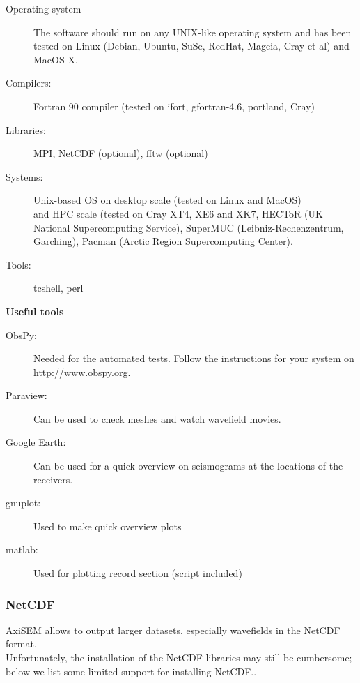 \documentclass{article}
\begin{document}
\begin{description}
    \item[Operating system] The software should run on any UNIX-like operating system and has
          been tested on Linux (Debian, Ubuntu, SuSe, RedHat, Mageia, Cray et al) and MacOS X.
    \item[Compilers:] Fortran 90 compiler (tested on ifort, gfortran-4.6, portland, Cray)
    \item[Libraries:] MPI, NetCDF (optional), fftw (optional)
    \item[Systems:] Unix-based OS on desktop scale (tested on Linux and MacOS)\\ and HPC scale (tested on Cray XT4, XE6 and XK7, HECToR (UK National Supercomputing Service), SuperMUC (Leibniz-Rechenzentrum, Garching), Pacman (Arctic Region Supercomputing Center).
    \item[Tools:] tcshell, perl
\end{description}\vspace*{0.3cm}

\textbf{Useful tools}

\begin{description}
    \item[ObsPy:] Needed for the automated tests. Follow the instructions for your system
          on \url{http://www.obspy.org}.
    \item[Paraview:] Can be used to check meshes and watch wavefield movies.
    \item[Google Earth:] Can be used for a quick overview on seismograms at the locations
          of the receivers.
    \item[gnuplot:] Used to make quick overview plots
    \item[matlab:] Used for plotting record section (script included)
\end{description}


\subsubsection{NetCDF}
\label{sssec:netcdf}

AxiSEM allows to output larger datasets, especially wavefields in the NetCDF format. \\
Unfortunately, the installation of the NetCDF libraries may still be cumbersome; below we
list some limited support for installing NetCDF..
\end{document}
